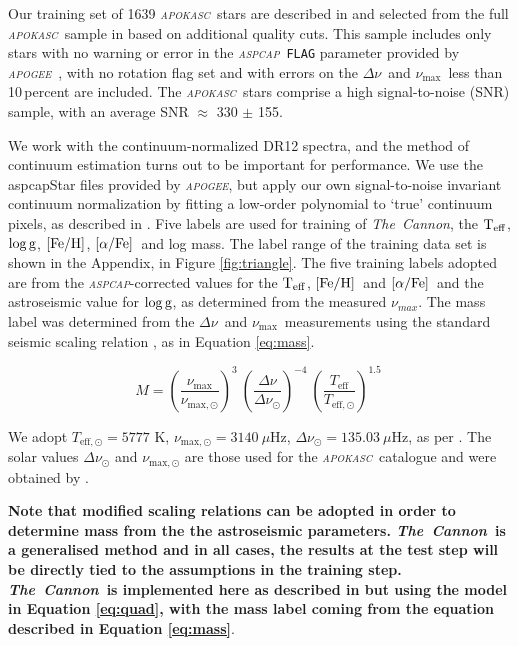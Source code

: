 \documentclass[12pt, preprint]{aastex}
\newcommand{\project}[1]{\textsl{#1}}
\newcommand{\tc}{\project{The~Cannon}}
\newcommand{\apogee}{\project{\textsc{apogee}}}
\newcommand{\apokasc}{\project{\textsc{apokasc}}}
\newcommand{\aspcap}{\project{\textsc{aspcap}}}
\newcommand{\code}[1]{\texttt{#1}}
\newcommand{\teff}{\mbox{$\rm T_{eff}$}}
\newcommand{\feh}{\mbox{$\rm [Fe/H]$}}
\newcommand{\alphafe}{\mbox{$\rm [\alpha/Fe]$}}
\newcommand{\logg}{\mbox{$\rm \log g$}}
\newcommand{\numax}{$\nu_{\max}$}
\newcommand{\deltanu}{$\Delta\nu$}
\begin{document}
Our training set of 1639 \apokasc\ stars are described in \citet{Martig2014} and selected from the full \apokasc\ sample in \citet{P2014} based on additional quality cuts. This sample includes only stars with no warning or error in the \aspcap\ \code{FLAG} parameter provided by \apogee\ \citep{Ahn2014}, with no rotation flag set and with errors on the \deltanu\ and \numax\ less than 10\,percent are included. The \apokasc\ stars comprise a high signal-to-noise (SNR) sample, with an average SNR $\approx$ 330 $\pm$ 155. 

We work with the continuum-normalized DR12 spectra, and the method of continuum
estimation turns out to be important for performance. We use the aspcapStar files provided by \apogee, but apply our own signal-to-noise invariant continuum normalization by fitting a low-order polynomial to `true' continuum pixels, as described in \citet{Ness2015}. 
%
Five labels are used for training of \tc, the \teff, \logg, \feh, \alphafe\ and log mass. The label range of the training data set is shown in the Appendix, in Figure \ref{fig:triangle}. 
 The five training labels adopted are from the \aspcap-corrected values  \citep{Meszaros2013} for the \teff, \feh\ and \alphafe\ and the astroseismic value for \logg, as determined from the measured $\nu_{max}$. The mass label was determined from the  \deltanu\ and \numax\ measurements using the standard seismic scaling relation \citep[e.g.][]{K1995}, as in Equation \ref{eq:mass}. 

\begin{equation} \label{eq:mass}
M= \left( \frac{\nu_{\mathrm{max}}}{\nu_{\mathrm{max,\odot}}}\right)^3\  \left( \frac{\Delta \nu}{\Delta \nu_{\odot}}\right)^{-4} \ \left( \frac{T_{\mathrm{eff}}}{T_{\mathrm{eff,\odot}}}\right)^{1.5} \ 
\end{equation}

We adopt  $T_{\mathrm{eff,\odot}}=5777$ K, $\nu_{\mathrm{max,\odot}}=3140\ \mu$Hz, $\Delta \nu_{\odot}=135.03\ \mu$Hz, as per \citet{Martig2014}. The solar values  $\Delta \nu_{\odot}$ and $\nu_{\mathrm{max,\odot}}$ are those used for the \apokasc\ catalogue and were obtained by \cite{Hekker2013}.

\textbf{Note that modified scaling relations can be adopted in order to determine mass from the the astroseismic parameters. \tc\ is a generalised method and in all cases, the results at the test step will be directly tied to the assumptions in the training step. \tc\ is implemented here as described in \citet{Ness2015} but using the model in Equation \ref{eq:quad}, with the mass label coming from the equation described in Equation \ref{eq:mass}}.  
\end{document}
